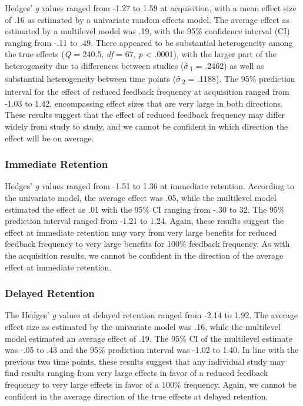 \documentclass[
  english,
  man,mask,floatsintext]{apa7}
\begin{document}
Hedges' \emph{g} values ranged from -1.27 to 1.59 at acquisition, with a mean effect size of .16 as estimated by a univariate random effects model. The average effect as estimated by a multilevel model was .19, with the 95\% confidence interval (CI) ranging from -.11 to .49. There appeared to be substantial heterogeneity among the true effects (\emph{Q} = 240.5, \emph{df} = 67, \emph{p} \textless{} .0001), with the larger part of the heterogeneity due to differences between studies (\(\hat{\small\sigma}\)\textsubscript{1} = .2462) as well as substantial heterogeneity between time points (\(\hat{\small\sigma}\)\textsubscript{2} = .1188). The 95\% prediction interval for the effect of reduced feedback frequency at acquisition ranged from -1.03 to 1.42, encompassing effect sizes that are very large in both directions. These results suggest that the effect of reduced feedback frequency may differ widely from study to study, and we cannot be confident in which direction the effect will be on average.

\hypertarget{immediate-retention}{%
\subsubsection{Immediate Retention}\label{immediate-retention}}

Hedges' \emph{g} values ranged from -1.51 to 1.36 at immediate retention. According to the univariate model, the average effect was .05, while the multilevel model estimated the effect as .01 with the 95\% CI ranging from -.30 to 32. The 95\% prediction interval ranged from -1.21 to 1.24. Again, these results suggest the effect at immediate retention may vary from very large benefits for reduced feedback frequency to very large benefits for 100\% feedback frequency. As with the acquisition results, we cannot be confident in the direction of the average effect at immediate retention.

\hypertarget{delayed-retention}{%
\subsubsection{Delayed Retention}\label{delayed-retention}}

The Hedges' \emph{g} values at delayed retention ranged from -2.14 to 1.92. The average effect size as estimated by the univariate model was .16, while the multilevel model estimated an average effect of .19. The 95\% CI of the multilevel estimate was -.05 to .43 and the 95\% prediction interval was -1.02 to 1.40. In line with the previous two time points, these results suggest that any individual study may find results ranging from very large effects in favor of a reduced feedback frequency to very large effects in favor of a 100\% frequency. Again, we cannot be confident in the average direction of the true effects at delayed retention.
\end{document}
